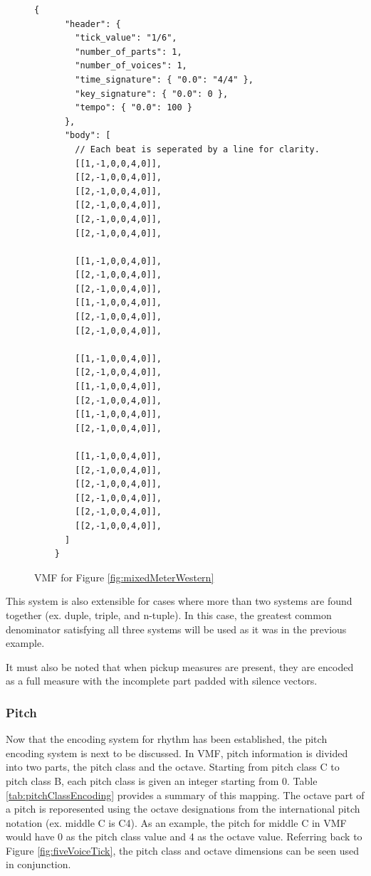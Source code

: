 \begin{figure}
  \begin{center}
    \begin{Verbatim}[fontfamily=courier, xleftmargin=\parindent]
    {
      "header": {
        "tick_value": "1/6",
        "number_of_parts": 1,
        "number_of_voices": 1,
        "time_signature": { "0.0": "4/4" },
        "key_signature": { "0.0": 0 },
        "tempo": { "0.0": 100 }
      },
      "body": [
        // Each beat is seperated by a line for clarity.
        [[1,-1,0,0,4,0]],
        [[2,-1,0,0,4,0]],
        [[2,-1,0,0,4,0]],
        [[2,-1,0,0,4,0]],
        [[2,-1,0,0,4,0]],
        [[2,-1,0,0,4,0]],

        [[1,-1,0,0,4,0]],
        [[2,-1,0,0,4,0]],
        [[2,-1,0,0,4,0]],
        [[1,-1,0,0,4,0]],
        [[2,-1,0,0,4,0]],
        [[2,-1,0,0,4,0]],

        [[1,-1,0,0,4,0]],
        [[2,-1,0,0,4,0]],
        [[1,-1,0,0,4,0]],
        [[2,-1,0,0,4,0]],
        [[1,-1,0,0,4,0]],
        [[2,-1,0,0,4,0]],

        [[1,-1,0,0,4,0]],
        [[2,-1,0,0,4,0]],
        [[2,-1,0,0,4,0]],
        [[2,-1,0,0,4,0]],
        [[2,-1,0,0,4,0]],
        [[2,-1,0,0,4,0]],
      ]
    }
    \end{Verbatim}
    \caption{VMF for Figure \ref{fig:mixedMeterWestern}}
    \label{fig:mixedMeterVMF}
  \end{center}
\end{figure}

This system is also extensible for cases where more than two systems are found together (ex. duple, triple, and n-tuple). In this case, the greatest common denominator satisfying all three systems will be used as it was in the previous example.

It must also be noted that when pickup measures are present, they are encoded as a full measure with the incomplete part padded with silence vectors.

\subsubsection{Pitch}

Now that the encoding system for rhythm has been established, the pitch encoding system is next to be discussed. In VMF, pitch information is divided into two parts, the pitch class and the octave. Starting from pitch class C to pitch class B, each pitch class is given an integer starting from 0. Table \ref{tab:pitchClassEncoding} provides a summary of this mapping. The octave part of a pitch is reporesented using the octave designations from the international pitch notation (ex. middle C is C4). As an example, the pitch for middle C in VMF would have 0 as the pitch class value and 4 as the octave value. Referring back to Figure \ref{fig:fiveVoiceTick}, the pitch class and octave dimensions can be seen used in conjunction.

